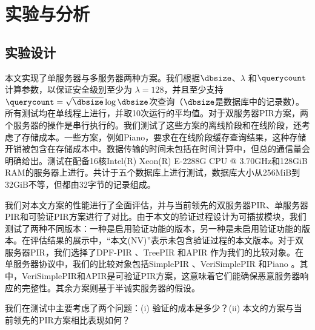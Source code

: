 \section{实验与分析}
\label{sec:evaluation}
\subsection{实验设计}
本文实现了单服务器与多服务器两种方案。我们根据$\dbsize$、$\lambda$ 和$\querycount$计算参数，以保证安全级别至少为 $\lambda=128$，并且至少支持$\querycount=\sqrt{\dbsize}\log{\dbsize}$次查询（$\dbsize$是数据库中的记录数）。所有测试均在单线程上进行，并取10次运行的平均值。对于双服务器PIR方案，两个服务器的操作是串行执行的。我们测试了这些方案的离线阶段和在线阶段，还考虑了存储成本。一些方案，例如Piano，要求在在线阶段缓存查询结果，这种存储开销被包含在存储成本中。数据传输的时间未包括在时间计算中，但总的通信量会明确给出。测试在配备16核Intel(R) Xeon(R) E-2288G CPU @ 3.70GHz和128GiB RAM的服务器上进行。共计于五个数据库上进行测试，数据库大小从256MiB到32GiB不等，但都由32字节的记录组成。

我们对本文方案的性能进行了全面评估，并与当前领先的双服务器PIR、单服务器PIR和可验证PIR方案进行了对比。由于本文的验证过程设计为可插拔模块，我们测试了两种不同版本：一种是启用验证功能的版本，另一种是未启用验证功能的版本。在评估结果的展示中，“本文(NV)”表示未包含验证过程的本文版本。对于双服务器PIR，我们选择了DPF-PIR \cite{EC:GilIsh14}、TreePIR \cite{C:LazPap23}和APIR \cite{APIR}作为我们的比较对象。在单服务器协议中，我们的比较对象包括SimplePIR \cite{SimplePIR}、VeriSimplePIR \cite{VeriSimplePIR}和Piano \cite{Piano}。其中，VeriSimplePIR和APIR是可验证PIR方案，这意味着它们能确保恶意服务器响应的完整性。其余方案则基于半诚实服务器的假设。

我们在测试中主要考虑了两个问题：(i) 验证的成本是多少？(ii) 本文的方案与当前领先的PIR方案相比表现如何？

